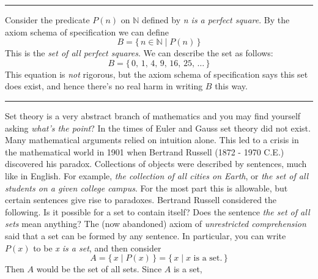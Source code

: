             \hrule
            \begin{example}
                Consider the predicate $P(n)$ on $\mathbb{N}$ defined by
                \textit{n is a perfect square}. By the axiom schema of
                specification we can define
                \begin{equation}
                    B=\{\,n\in\mathbb{N}\;|\;P(n)\,\}
                \end{equation}
                This is the \textit{set of all perfect squares}. We can describe
                the set as follows:
                \begin{equation}
                    B=\{\,0,\,1,\,4,\,9,\,16,\,25,\,\dots\,\}
                \end{equation}
                This equation is \textit{not} rigorous, but the axiom schema of
                specification says this set does exist, and hence there's no
                real harm in writing $B$ this way.
            \end{example}
            \hrule\par\hfill\par
            Set theory is a very abstract branch of mathematics and you may find
            yourself asking \textit{what's the point}? In the times of Euler and
            Gauss set theory did not exist. Many mathematical arguments relied
            on intuition alone. This led to a crisis in the mathematical world
            in 1901 when Bertrand Russell (1872 - 1970 C.E.) discovered his
            paradox. Collections of objects were described by sentences, much
            like in English. For example,
            \textit{the collection of all cities on Earth},
            or \textit{the set of all students on a given college campus}. For
            the most part this is allowable, but certain sentences give rise to
            paradoxes. Bertrand Russell considered the following.
            \textrm{Is it possible for a set to contain itself?} Does the
            sentence \textit{the set of all sets} mean anything? The
            (now abandoned) axiom of \textit{unrestricted comprehension} said
            that a set can be formed by any sentence. In particular, you can
            write $P(x)$ to be \textit{x is a set}, and then consider
            \begin{equation}
                A=\{\,x\;|\;P(x)\,\}=\{\,x\;|\;x\textrm{ is a set.}\,\}
            \end{equation}
            Then $A$ would be the set of all sets. Since $A$ is a set,
